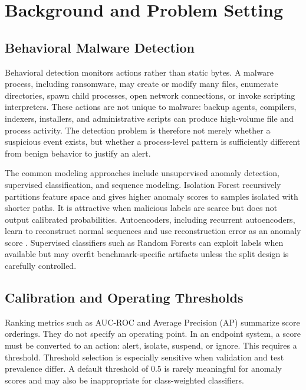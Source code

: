 \documentclass[10pt,journal,compsoc]{IEEEtran}
\begin{document}
\section{Background and Problem Setting}
\label{sec:background}

\subsection{Behavioral Malware Detection}

Behavioral detection monitors actions rather than static bytes. A malware process, including ransomware, may create or modify many files, enumerate directories, spawn child processes, open network connections, or invoke scripting interpreters. These actions are not unique to malware: backup agents, compilers, indexers, installers, and administrative scripts can produce high-volume file and process activity. The detection problem is therefore not merely whether a suspicious event exists, but whether a process-level pattern is sufficiently different from benign behavior to justify an alert.

The common modeling approaches include unsupervised anomaly detection, supervised classification, and sequence modeling. Isolation Forest \cite{liu2008} recursively partitions feature space and gives higher anomaly scores to samples isolated with shorter paths. It is attractive when malicious labels are scarce but does not output calibrated probabilities. Autoencoders, including recurrent autoencoders, learn to reconstruct normal sequences and use reconstruction error as an anomaly score \cite{cho2014,du2017}. Supervised classifiers such as Random Forests \cite{breiman2001} can exploit labels when available but may overfit benchmark-specific artifacts unless the split design is carefully controlled.

\subsection{Calibration and Operating Thresholds}

Ranking metrics such as AUC-ROC and Average Precision (AP) summarize score orderings. They do not specify an operating point. In an endpoint system, a score must be converted to an action: alert, isolate, suspend, or ignore. This requires a threshold. Threshold selection is especially sensitive when validation and test prevalence differ. A default threshold of 0.5 is rarely meaningful for anomaly scores and may also be inappropriate for class-weighted classifiers.
\end{document}
